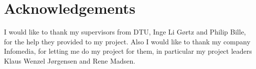 \chapter{Acknowledgements}

I would like to thank my supervisors from DTU, Inge Li Gørtz and Philip Bille, for the help they provided to my project. Also I would like to thank my company Infomedia, for letting me do my project for them, in particular my project leaders Klaus Wenzel Jørgensen and Rene Madsen.


